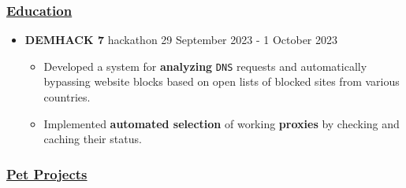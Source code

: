 \subsubsection{\texorpdfstring{\hyperref[Ryabinkovux5cux2520Semyonux5cux2520Pavlovich-Education]{Education}}{Education}}\label{Education}

\begin{itemize}
\tightlist
\item
  \label{Ryabinkovux20Semyonux20Pavlovich-Education-DEMHACKux207}{}\textbf{DEMHACK
  7} hackathon \textbar{} 29 September 2023 - 1 October 2023

  \begin{itemize}
  \tightlist
  \item
    Developed a system for
    \label{Ryabinkovux20Semyonux20Pavlovich-Education-analyzing}{}\textbf{analyzing}
    \texttt{DNS} requests and automatically bypassing website blocks
    based on open lists of blocked sites from various countries.
  \item
    Implemented
    \label{Ryabinkovux20Semyonux20Pavlovich-Education-automatedux20selection}{}\textbf{automated
    selection} of working
    \label{Ryabinkovux20Semyonux20Pavlovich-Education-proxies}{}\textbf{proxies}
    by checking and caching their status.
  \end{itemize}
\end{itemize}

\label{Ryabinkovux20Semyonux20Pavlovich-Petux20Projects}
\subsubsection{\texorpdfstring{\hyperref[Ryabinkovux5cux2520Semyonux5cux2520Pavlovich-Petux5cux2520Projects]{Pet
Projects}}{Pet Projects}}\label{Petux20Projects}

